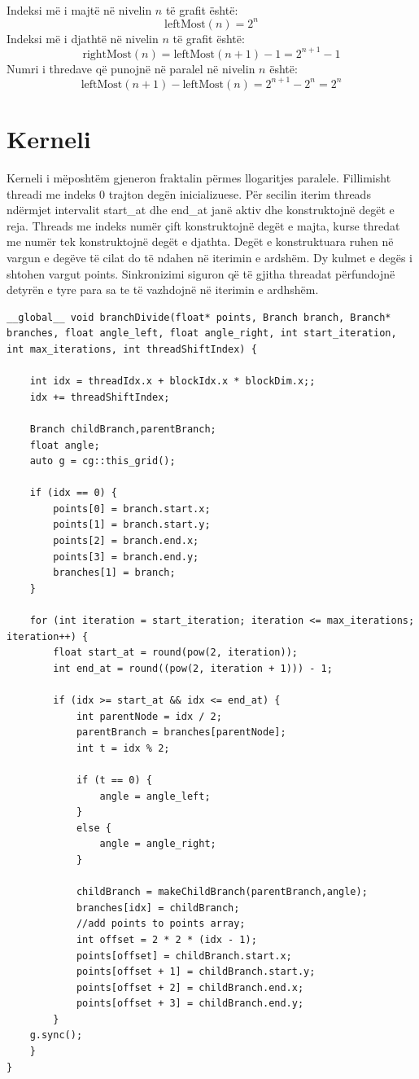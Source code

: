 \noindent \\ Indeksi më i majtë në nivelin \(n\) të grafit është:
\[ \text{leftMost}(n) = 2^n \]
\noindent Indeksi më i djathtë në nivelin \(n\) të grafit është:
\[ \text{rightMost}(n) = \text{leftMost}(n+1) - 1 = 2^{n+1} - 1 \]
\noindent  Numri i thredave që punojnë në paralel në nivelin \(n\) është:
\[ \text{leftMost}(n+1) - \text{leftMost}(n) = 2^{n+1} - 2^n = 2^n \]

\section{Kerneli}

\noindent Kerneli i mëposhtëm gjeneron fraktalin përmes llogaritjes paralele. Fillimisht threadi me indeks 0 trajton degën inicializuese. Për secilin iterim threads ndërmjet intervalit start\_at dhe end\_at janë aktiv dhe konstruktojnë degët e reja. Threads me indeks numër çift konstruktojnë degët e majta, kurse thredat me numër tek konstruktojnë degët e djathta.  Degët e konstruktuara ruhen në vargun e degëve të cilat do të ndahen në iterimin e ardshëm. Dy kulmet e degës i shtohen vargut points. Sinkronizimi siguron që të gjitha threadat përfundojnë detyrën e tyre para sa te të vazhdojnë në iterimin e ardhshëm. \\

\begin{lstlisting}
__global__ void branchDivide(float* points, Branch branch, Branch* branches, float angle_left, float angle_right, int start_iteration, int max_iterations, int threadShiftIndex) {

    int idx = threadIdx.x + blockIdx.x * blockDim.x;;
    idx += threadShiftIndex;
    
    Branch childBranch,parentBranch;
    float angle;
    auto g = cg::this_grid();
    
    if (idx == 0) {
        points[0] = branch.start.x;
        points[1] = branch.start.y;
        points[2] = branch.end.x;
        points[3] = branch.end.y;
        branches[1] = branch;
    }
    
    for (int iteration = start_iteration; iteration <= max_iterations; iteration++) {
        float start_at = round(pow(2, iteration));
        int end_at = round((pow(2, iteration + 1))) - 1;
    
        if (idx >= start_at && idx <= end_at) {
            int parentNode = idx / 2;
            parentBranch = branches[parentNode];
            int t = idx % 2;
            
            if (t == 0) {
                angle = angle_left;
            }
            else {
                angle = angle_right;
            }
            
            childBranch = makeChildBranch(parentBranch,angle);
            branches[idx] = childBranch;
            //add points to points array;
            int offset = 2 * 2 * (idx - 1);
            points[offset] = childBranch.start.x;
            points[offset + 1] = childBranch.start.y;
            points[offset + 2] = childBranch.end.x;
            points[offset + 3] = childBranch.end.y;
        }
    g.sync();
    }
}
\end{lstlisting}


